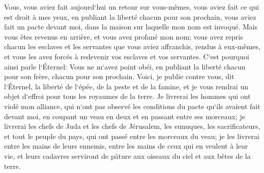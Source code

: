 \verse Vous, vous aviez fait aujourd`hui un retour sur vous-mêmes, vous aviez fait ce qui est droit à mes yeux, en publiant la liberté chacun pour son prochain, vous aviez fait un pacte devant moi, dans la maison sur laquelle mon nom est invoqué. 
\verse Mais vous êtes revenus en arrière, et vous avez profané mon nom; vous avez repris chacun les esclaves et les servantes que vous aviez affranchis, rendus à eux-mêmes, et vous les avez forcés à redevenir vos esclaves et vos servantes. 
\verse C`est pourquoi ainsi parle l`Éternel: Vous ne m`avez point obéi, en publiant la liberté chacun pour son frère, chacun pour son prochain. Voici, je publie contre vous, dit l`Éternel, la liberté de l`épée, de la peste et de la famine, et je vous rendrai un objet d`effroi pour tous les royaumes de la terre. 
\verse Je livrerai les hommes qui ont violé mon alliance, qui n`ont pas observé les conditions du pacte qu`ils avaient fait devant moi, en coupant un veau en deux et en passant entre ses morceaux; 
\verse je livrerai les chefs de Juda et les chefs de Jérusalem, les eunuques, les sacrificateurs, et tout le peuple du pays, qui ont passé entre les morceaux du veau; 
\verse je les livrerai entre les mains de leurs ennemis, entre les mains de ceux qui en veulent à leur vie, et leurs cadavres serviront de pâture aux oiseaux du ciel et aux bêtes de la terre. 
